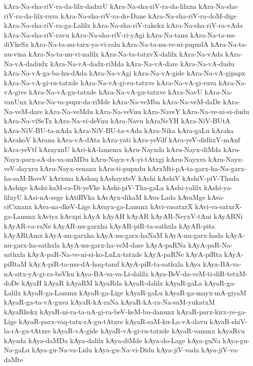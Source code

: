 {kAra-Na-sha-riV-ra-da-lilx-dadxrU
kAra-Na-sha-riV-ra-da-lilxna
kAra-Na-sha-riV-ra-da-lilx-ruva
kAra-Na-sha-riV-ra-do-Dane
kAra-Na-sha-riV-ra-doM-dige
kAra-Na-sha-riV-ra-ga-Lalilx
kAra-Na-sha-riV-rakekx
kAra-Na-sha-riV-ra-vAda
kAra-Na-sha-riV-ravu
kAra-Na-sha-riV-ri-yAgi
kAra-Na-tanu
kAra-Na-ta-nu-diVkeSx
kAra-Na-ta-nu-tarx-ya-vi-ralu
kAra-Na-ta-nu-ve-ni-pupxdA
kAra-Na-ta-nu-vina
kAra-Na-ta-nu-vi-nalilx
kAra-Na-ta-tatxvX-dalilx
kAra-Na-vAda
kAra-Na-vA-dadudx
kAra-Na-vA-dadx-riMda
kAra-Na-vA-dare
kAra-Na-vA-dudu
kAra-Na-vA-ga-ba-hu-dAda
kAra-Na-vAgi
kAra-Na-vA-gide
kAra-Na-vA-gipapx
kAra-Na-vA-gi-ru-tatxde
kAra-Na-vA-gi-ru-tatxve
kAra-Na-vA-gi-ruva
kAra-Na-vA-give
kAra-Na-vA-gu-tatxde
kAra-Na-vA-gu-tatxve
kAra-NavU
kAra-Na-vanUnx
kAra-Na-va-pupx-da-riMde
kAra-Na-veMba
kAra-Na-veM-daDe
kAra-Na-veM-dare
kAra-Na-veMdu
kAra-Na-veVnu
kAra-NaveY
kAra-Na-ve-ni-si-dudu
kAra-Na-viSeTx
kAra-Na-vi-deVnu
kAra-Navu
kAraNeYH
kAra-NiV-BUtA
kAra-NiV-BU-ta-nAda
kAra-NiV-BU-ta-vAda
kAra-Nika
kAra-gaLu
kAraka
kArakoV
kArana
kAra-vA-dAta
kAra-yati
kAra-yeVdf
kAra-yeV-didhxV-mAnf
kAra-yeVtf
kArayxnU
kAri-kA-lamemx
kAru-Nayxda
kAru-Nayx-diMda
kAru-Nayx-parx-sA-da-va-nuMDu
kAru-Nayx-vA-yi-tAtxgi
kAru-Nayxva
kAru-Nayx-veV-dayxru
kAru-Nayx-venanx
kAru-ti-pupxdu
kArxMti-pA-ta-garx-ha-Na-garx-ha-saM-BaveV
kArxma
kAshaq
kAshayxteV
kAshi
kAshiV
kAshiV-piV-Thada
kAshige
kAshi-kaM-ca-Di-yeVke
kAshi-piV-Tha-gaLa
kAshi-yalilx
kAshi-ya-lilxyU
kAsi-nA-sege
kAtiRVka
kAvAyx-dikaM
kAva-Lada
kAvaMge
kAva-ciCxnanx
kAva-na-dkeV-Lige
kAvayx-ga-Lanunx
kAvi-vasatxrX
kAvi-va-satxrX-ga-Lanunx
kAviya
kAvxpi
kAyA
kAyAH
kAyAR
kAyAR-NeyxV-tAni
kAyARNi
kAyAR-ca-raNe
kAyAR-nu-garxha
kAyAR-piR-ta-sathxla
kAyAR-pita
kAyARtAmx
kAyA-nu-garxha
kAyA-nu-garx-haNaM
kAyA-nu-garx-hada
kAyA-nu-garx-ha-sathxla
kAyA-nu-garx-ha-veM-dare
kAyA-paRNa
kAyA-paR-Na-sathxla
kAyA-paR-Na-ve-ni-si-ko-LuLx-tatxde
kAyA-paRNe
kAyA-piRta
kAyA-piRtaM
kAyA-piR-ta-mu-dA-haq-tamf
kAyA-piR-ta-sathxla
kAya
kAya-BA-va-nA-sitx-yA-gi-ra-beVku
kAya-BA-va-va-Li-dalilx
kAya-BeV-da-veM-ti-diR-tetxM-doDe
kAyaH
kAyaR
kAyaRM
kAyaRda
kAyaR-dalilx
kAyaR-gaLa
kAyaR-ga-Lalilx
kAyaR-ga-Lanunx
kAyaR-ga-Lige
kAyaR-gaLu
kAyaR-ga-mayx-mA-giyaM
kAyaR-ga-ta-vA-guva
kAyaR-kA-raNa
kAyaR-kA-ra-Na-saM-yukatxM
kAyaRkekx
kAyaR-ni-ra-ta-nA-gi-ra-beV-keM-bu-danunx
kAyaR-parx-kirx-ye-ga-Lige
kAyaR-parx-vaq-tatx-rA-gu-tAtxre
kAyaR-saM-ku-La-vA-davu
kAyaR-shiV-la-rA-gu-tAtxre
kAyaR-vA-gide
kAyaR-vA-gi-ru-tatxde
kAyaR-vanunx
kAyaRvu
kAyada
kAya-daMDa
kAya-dalilx
kAya-diMde
kAya-do-Lage
kAya-guNa
kAya-gu-Na-gaLu
kAya-gu-Na-va-Lidu
kAya-gu-Na-vi-Didu
kAya-jiV-vada
kAya-jiV-va-daMte
}
